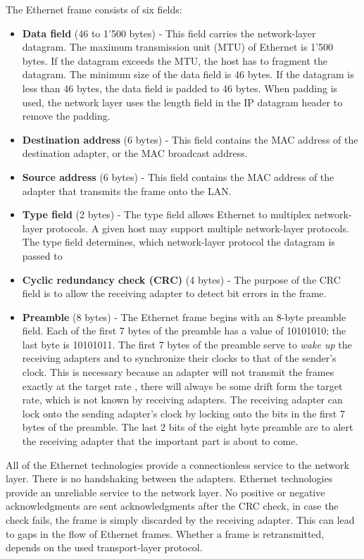 The Ethernet frame consists of six fields:
\begin{itemize}
\item \textbf{Data field} (46 to 1'500 bytes) - This field carries the network-layer datagram. The maximum transmission unit (MTU) of Ethernet is 1'500 bytes. If the datagram exceeds the MTU, the host has to fragment the datagram. The minimum size of the data field is 46 bytes. If the datagram is less than 46 bytes, the data field is padded to 46 bytes. When padding is used, the network layer uses the length field in the IP datagram header to remove the padding.
\item \textbf{Destination address} (6 bytes) - This field contains the MAC address of the destination adapter, or the MAC broadcast address.
\item \textbf{Source address} (6 bytes) - This field contains the MAC address of the adapter that transmits the frame onto the LAN.
\item \textbf{Type field} (2 bytes) - The type field allows Ethernet to multiplex network-layer protocols. A given host may support multiple network-layer protocols. The type field determines, which network-layer protocol the datagram is passed to
\item \textbf{Cyclic redundancy check (CRC)} (4 bytes) - The purpose of the CRC field is to allow the receiving adapter to detect bit errors in the frame.
\item \textbf{Preamble} (8 bytes) - The Ethernet frame begins with an 8-byte preamble field. Each of the first 7 bytes of the preamble has a value of 10101010; the last byte is 10101011. The first 7 bytes of the preamble serve to \textit{wake up} the receiving adapters and to synchronize their clocks to that of the sender's clock. This is necessary because an adapter will not transmit the frames exactly at the target rate , there will always be some drift form the target rate, which is not known by receiving adapters. The receiving adapter can lock onto the sending adapter's clock by locking onto the bits in the first 7 bytes of the preamble. The last 2 bits of the eight byte preamble are to alert the receiving adapter that the important part is about to come.
\end{itemize}
All of the Ethernet technologies provide a connectionless service to the network layer. There is no handshaking between the adapters. Ethernet technologies provide an unreliable service to the network layer. No positive or negative acknowledgments are sent acknowledgments after the CRC check, in case the check fails, the frame is simply discarded by the receiving adapter. This can lead to gaps in the flow of Ethernet frames. Whether a frame is retransmitted, depends on the used transport-layer protocol.


